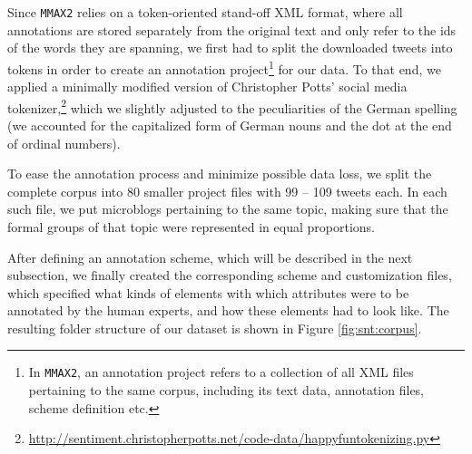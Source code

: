 Since \texttt{MMAX2} relies on a token-oriented stand-off XML format,
where all annotations are stored separately from the original text and
only refer to the ids of the words they are spanning, we first had to
split the downloaded tweets into tokens in order to create an
annotation project\footnote{In \texttt{MMAX2}, an annotation project
  refers to a collection of all XML files pertaining to the same
  corpus, including its text data, annotation files, scheme definition
  etc.} for our data.  To that end, we applied a minimally modified
version of Christopher Potts' social media
tokenizer,\footnote{\url{http://sentiment.christopherpotts.net/code-data/happyfuntokenizing.py}}
which we slightly adjusted to the peculiarities of the German spelling
(we accounted for the capitalized form of German nouns and the dot at
the end of ordinal numbers).

To ease the annotation process and minimize possible data loss, we
split the complete corpus into 80 smaller project files with 99 -- 109
tweets each.  In each such file, we put microblogs pertaining to the
same topic, making sure that the formal groups of that topic were
represented in equal proportions.

After defining an annotation scheme, which will be described in the
next subsection, we finally created the corresponding scheme and
customization files, which specified what kinds of elements with which
attributes were to be annotated by the human experts, and how these
elements had to look like.  The resulting folder structure of our
dataset is shown in Figure \ref{fig:snt:corpus}.

